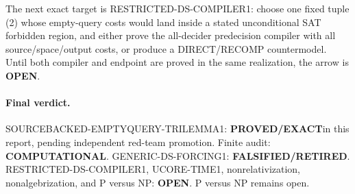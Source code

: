 \documentclass[11pt]{article}
\newcommand{\EXACT}{\textbf{PROVED/EXACT}}
\newcommand{\OPEN}{\textbf{OPEN}}
\newcommand{\RETIRED}{\textbf{FALSIFIED/RETIRED}}
\newcommand{\COMP}{\textbf{COMPUTATIONAL}}
\begin{document}
The next exact target is \textsf{RESTRICTED-DS-COMPILER1}: choose one fixed
tuple (2) whose empty-query costs would land inside a stated unconditional
SAT forbidden region, and either prove the all-decider predecision compiler
with all source/space/output costs, or produce a DIRECT/RECOMP countermodel.
Until both compiler and endpoint are proved in the same realization, the
arrow is \OPEN.

\paragraph{Final verdict.}
\textsf{SOURCEBACKED-EMPTYQUERY-TRILEMMA1}: \EXACT in this report, pending
independent red-team promotion.  Finite audit: \COMP.
\textsf{GENERIC-DS-FORCING1}: \RETIRED.
\textsf{RESTRICTED-DS-COMPILER1}, UCORE-TIME1, nonrelativization,
nonalgebrization, and P versus NP: \OPEN.  P versus NP remains open.

\end{document}
